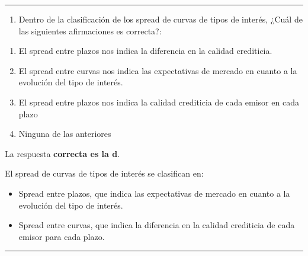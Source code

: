 \documentclass[
  letterpaper,
  DIV=11,
  numbers=noendperiod]{scrreprt}
\providecommand{\tightlist}{%
  \setlength{\itemsep}{0pt}\setlength{\parskip}{0pt}}\usepackage{longtable,booktabs,array}
\begin{document}
\begin{center}\rule{0.5\linewidth}{0.5pt}\end{center}

\begin{enumerate}
\def\labelenumi{\arabic{enumi}.}
\setcounter{enumi}{27}
\tightlist
\item
  Dentro de la clasificación de los spread de curvas de tipos de
  interés, ¿Cuál de las siguientes afirmaciones es correcta?:
\end{enumerate}

\begin{enumerate}
\def\labelenumi{\alph{enumi}.}
\item
  El spread entre plazos nos indica la diferencia en la calidad
  crediticia.
\item
  El spread entre curvas nos indica las expectativas de mercado en
  cuanto a la evolución del tipo de interés.
\item
  El spread entre plazos nos indica la calidad crediticia de cada emisor
  en cada plazo
\item
  Ninguna de las anteriores
\end{enumerate}

\begin{tcolorbox}[enhanced jigsaw, left=2mm, opacityback=0, colback=white, breakable, arc=.35mm, bottomrule=.15mm, rightrule=.15mm, toprule=.15mm, leftrule=.75mm, colframe=quarto-callout-tip-color-frame]
\begin{minipage}[t]{5.5mm}
\textcolor{quarto-callout-tip-color}{\faLightbulb}
\end{minipage}%
\begin{minipage}[t]{\textwidth - 5.5mm}

La respuesta \textbf{correcta es la d}.

El spread de curvas de tipos de interés se clasifican en:

\begin{itemize}
\item
  Spread entre plazos, que indica las expectativas de mercado en cuanto
  a la evolución del tipo de interés.
\item
  Spread entre curvas, que indica la diferencia en la calidad crediticia
  de cada emisor para cada plazo.
\end{itemize}

\end{minipage}%
\end{tcolorbox}

\begin{center}\rule{0.5\linewidth}{0.5pt}\end{center}
\end{document}

